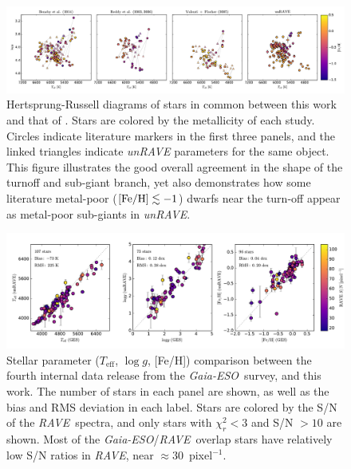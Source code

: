 \documentclass[preprint,trackchanges]{aastex}
\newcommand{\acronym}[1]{{\small{#1}}}
\newcommand{\project}[1]{\textsl{#1}}
\newcommand{\rave}{\project{\acronym{RAVE}}}
\newcommand{\ges}{\project{Gaia-ESO}}
\newcommand{\teff}{T_{\mathrm{eff}}}
\newcommand{\logg}{\log g}
\begin{document}
\begin{figure}[p]
\includegraphics[width=\textwidth]{figures/gold-standard-hrd.pdf}
\caption{Hertsprung-Russell diagrams of stars in common between this work and that of \citet{Bensby_2014,Reddy_2003,Reddy_2006,Valenti_Fischer_2005}.  Stars are colored by the metallicity of each study. Circles indicate literature markers in the first three panels, and the linked triangles indicate \project{unRAVE} parameters for the same object. This figure illustrates the good overall agreement in the shape of the turnoff and sub-giant branch, yet also demonstrates how some literature metal-poor ($[{\rm Fe/H}] \lesssim -1$) dwarfs near the turn-off appear as metal-poor sub-giants in \project{unRAVE}.\label{fig:gold-standard-hrd}}
\end{figure}


\begin{figure}[p]
\includegraphics[width=\textwidth]{figures/ges-comparison.pdf}
\caption{Stellar parameter ($\teff$, $\logg$, [Fe/H]) comparison between the fourth internal data release from the \ges\ survey, and this work. The number of stars in each panel are shown, as well as the bias and RMS deviation in each label. Stars are colored by the S/N of the \rave\ spectra, and only stars with $\chi_r^2 < 3$ and S/N $> 10$ are shown.  Most of the \ges/\rave\ overlap stars have relatively low S/N ratios in \rave, near $\approx 30$~pixel$^{-1}$.\label{fig:ges-stellar-parameters}}
\end{figure}
\end{document}

